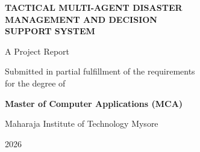 \documentclass[12pt,a4paper]{report}
\begin{document}
\begin{titlepage}
\centering
\vspace*{2cm}
{\LARGE\bfseries TACTICAL MULTI-AGENT DISASTER\\[0.4cm]
MANAGEMENT AND DECISION\\[0.4cm]
SUPPORT SYSTEM\par}
\vspace{2cm}
{\large A Project Report\par}
\vspace{0.5cm}
{\large Submitted in partial fulfillment of the requirements\\
for the degree of\par}
\vspace{0.5cm}
{\large\bfseries Master of Computer Applications (MCA)\par}
\vspace{2cm}
{\large Maharaja Institute of Technology Mysore\par}
\vspace{1cm}
{\large 2026\par}
\end{titlepage}




\tableofcontents
\newpage

\listoffigures
\newpage

\listoftables
\newpage











\end{document}
